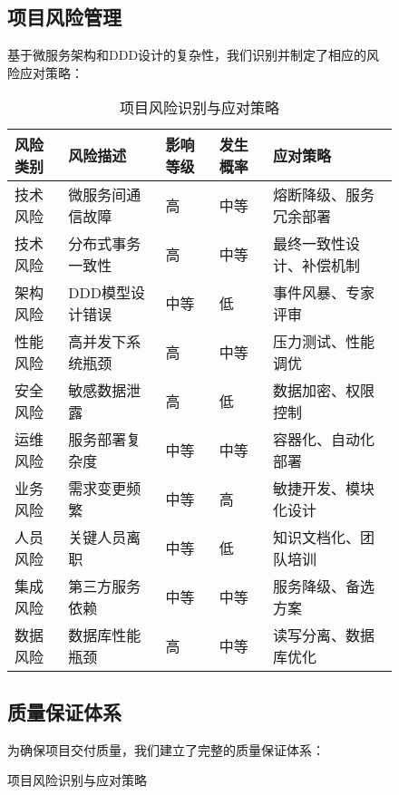 \documentclass[a4paper,12pt]{article}
\begin{document}
\begin{figure}[H]
\subsection{项目风险管理}

基于微服务架构和DDD设计的复杂性，我们识别并制定了相应的风险应对策略：

\begin{table}[H]
\centering
\caption{项目风险识别与应对策略}
\begin{tabular}{|p{2cm}|p{3cm}|p{1.5cm}|p{3cm}|p{3.5cm}|}
\hline
\textbf{风险类别} & \textbf{风险描述} & \textbf{影响等级} & \textbf{发生概率} & \textbf{应对策略} \\
\hline
技术风险 & 微服务间通信故障 & 高 & 中等 & 熔断降级、服务冗余部署 \\
\hline
技术风险 & 分布式事务一致性 & 高 & 中等 & 最终一致性设计、补偿机制 \\
\hline
架构风险 & DDD模型设计错误 & 中等 & 低 & 事件风暴、专家评审 \\
\hline
性能风险 & 高并发下系统瓶颈 & 高 & 中等 & 压力测试、性能调优 \\
\hline
安全风险 & 敏感数据泄露 & 高 & 低 & 数据加密、权限控制 \\
\hline
运维风险 & 服务部署复杂度 & 中等 & 中等 & 容器化、自动化部署 \\
\hline
业务风险 & 需求变更频繁 & 中等 & 高 & 敏捷开发、模块化设计 \\
\hline
人员风险 & 关键人员离职 & 中等 & 低 & 知识文档化、团队培训 \\
\hline
集成风险 & 第三方服务依赖 & 中等 & 中等 & 服务降级、备选方案 \\
\hline
数据风险 & 数据库性能瓶颈 & 高 & 中等 & 读写分离、数据库优化 \\
\hline
\end{tabular}
\end{table}

\subsection{质量保证体系}

为确保项目交付质量，我们建立了完整的质量保证体系：


\end{figure}
\end{document}
